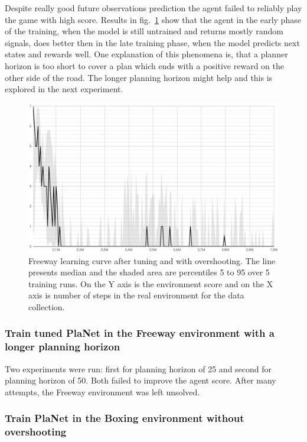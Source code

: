 Despite really good future observations prediction the agent failed to reliably play the game with high score. Results in fig.~\ref{Fig.Freeway_with_overshooting} show that the agent in the early phase of the training, when the model is still untrained and returns mostly random signals, does better then in the late training phase, when the model predicts next states and rewards well. One explanation of this phenomena is, that a planner horizon is too short to cover a plan which ends with a positive reward on the other side of the road. The longer planning horizon might help and this is explored in the next experiment.

\begin{figure}[H]
\includegraphics[width=1\textwidth,keepaspectratio]{figures/PlaNet/Freeway_with_overshooting.png}
\caption[Freeway learning curve after tuning and with overshooting]{Freeway learning curve after tuning and with overshooting. The line presents median and the shaded area are percentiles 5 to 95 over 5 training runs. On the Y axis is the environment score and on the X axis is number of steps in the real environment for the data collection.}
\label{Fig.Freeway_with_overshooting}
\end{figure}

\subsubsection{Train tuned PlaNet in the Freeway environment with a longer planning horizon}

Two experiments were run: first for planning horizon of 25 and second for planning horizon of 50. Both failed to improve the agent score. After many attempts, the Freeway environment was left unsolved.

\subsubsection{Train PlaNet in the Boxing environment without overshooting}

